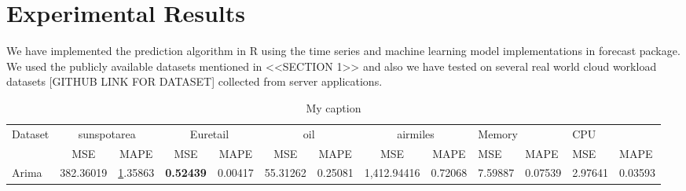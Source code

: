 \section{Experimental Results}
\usepackage{booktabs}
\usepackage{multirow}
\usepackage[normalem]{ulem}
\useunder{\uline}{\ul}{}


We have implemented the prediction algorithm in R using the time series and machine learning model implementations in forecast package. We used the publicly available datasets mentioned in <<SECTION 1>> and also we have tested on several real world cloud workload datasets [GITHUB LINK FOR DATASET] collected from server applications.

\begin{table}[]
\centering
\caption{My caption}
\label{my-label}
\begin{tabular}{@{}lrrrrrrrrllll@{}}
\toprule
\multicolumn{1}{c}{\multirow{2}{*}{Dataset}} & \multicolumn{2}{c}{sunspotarea}                                                      & \multicolumn{2}{c}{Euretail}                                                 & \multicolumn{2}{c}{oil}                                                       & \multicolumn{2}{c}{airmiles}                                                     & \multicolumn{2}{l}{Memory}                                                    & \multicolumn{2}{l}{CPU}                                                       \\ \cmidrule(l){2-13} 
\multicolumn{1}{c}{}                         & \multicolumn{1}{c|}{MSE}                      & \multicolumn{1}{c|}{MAPE}            & \multicolumn{1}{c|}{MSE}              & \multicolumn{1}{c|}{MAPE}            & \multicolumn{1}{c|}{MSE}              & \multicolumn{1}{c|}{MAPE}             & \multicolumn{1}{c|}{MSE}                 & \multicolumn{1}{c|}{MAPE}             & \multicolumn{1}{l|}{MSE}              & \multicolumn{1}{l|}{MAPE}             & \multicolumn{1}{l|}{MSE}              & \multicolumn{1}{l|}{MAPE}             \\ \midrule
\multicolumn{1}{|l|}{Arima}                  & \multicolumn{1}{r|}{382.36019}                & \multicolumn{1}{r|}{{\ul 1.35863}}   & \multicolumn{1}{r|}{\textbf{0.52439}} & \multicolumn{1}{r|}{0.00417}         & \multicolumn{1}{r|}{55.31262}         & \multicolumn{1}{r|}{0.25081}          & \multicolumn{1}{r|}{1,412.94416}         & \multicolumn{1}{r|}{0.72068}          & \multicolumn{1}{l|}{7.59887}          & \multicolumn{1}{l|}{0.07539}          & \multicolumn{1}{l|}{2.97641}          & \multicolumn{1}{l|}{0.03593}          \\ \midrule

\end{tabular}
\end{table}
